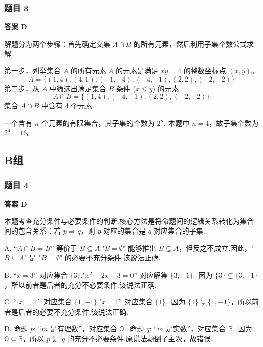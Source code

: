 \subsubsection*{题目 3}
\begin{solution}
	\textbf{答案 D}
	
	解题分为两个步骤：首先确定交集 $A \cap B$ 的所有元素，然后利用子集个数公式求解.
	
	第一步，列举集合 $A$ 的所有元素.$A$ 的元素是满足 $xy=4$ 的整数坐标点 $(x,y)$。
	\[ A = \{(1,4), (4,1), (-1,-4), (-4,-1), (2,2), (-2,-2)\} \]
	第二步，从 $A$ 中筛选出满足集合 $B$ 条件 ($x \le y$) 的元素.
	\[ A \cap B = \{(1,4), (-4,-1), (2,2), (-2,-2)\} \]
	集合 $A \cap B$ 中含有 4 个元素.
	
	一个含有 $n$ 个元素的有限集合，其子集的个数为 $2^n$.
	本题中 $n=4$，故子集个数为 $2^4 = 16$。
\end{solution}

\subsection*{B组}

\subsubsection*{题目 4}
\begin{solution}
	\textbf{答案 D}
	
	本题考查充分条件与必要条件的判断.核心方法是将命题间的逻辑关系转化为集合间的包含关系：若 $p \Rightarrow q$，则 $p$ 对应的集合是 $q$ 对应集合的子集.
	
	A. ``$A \cap B = B$'' 等价于 $B \subseteq A$."$B=\emptyset$" 能够推出 $B \subseteq A$，但反之不成立.因此，"$B \subseteq A$" 是 "$B=\emptyset$" 的必要不充分条件.该说法正确.
	
	B. ``$x=3$'' 对应集合 $\{3\}$."$x^2-2x-3=0$'' 对应解集 $\{3, -1\}$.\ 因为 $\{3\} \subsetneq \{3, -1\}$，所以前者是后者的充分不必要条件.该说法正确.
	
	C. ``$|x|=1$'' 对应集合 $\{1, -1\}$."$x=1$'' 对应集合 $\{1\}$.\ 因为 $\{1\} \subsetneq \{1, -1\}$，所以前者是后者的必要不充分条件.该说法正确.
	
	D. 命题 $p$: ``$m$ 是有理数''，对应集合 $\mathbb{Q}$.\ 命题 $q$: ``$m$ 是实数''，对应集合 $\mathbb{R}$.\ 因为 $\mathbb{Q} \subsetneq \mathbb{R}$，所以 $p$ 是 $q$ 的充分不必要条件.原说法颠倒了主次，故错误.
\end{solution}

